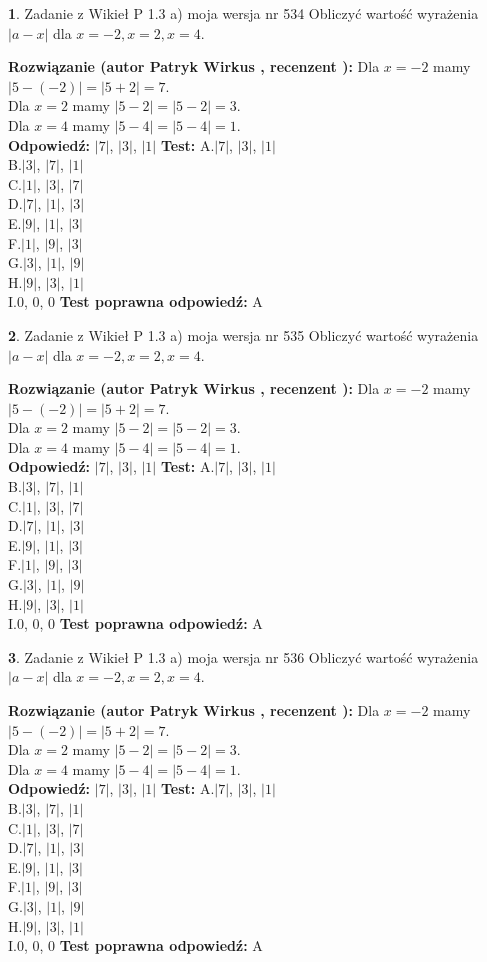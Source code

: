 \documentclass[12pt, a4paper]{article}
\theoremstyle{definition} %
\newtheorem{zad}{}
\newcommand{\zadStart}[1]{\begin{zad}#1\newline}
\newcommand{\zadStop}{\end{zad}}
\newcommand{\rozwStart}[2]{\noindent \textbf{Rozwiązanie (autor #1 , recenzent #2): }\newline}
\newcommand{\rozwStop}{\newline}
\newcommand{\odpStart}{\noindent \textbf{Odpowiedź:}\newline}
\newcommand{\odpStop}{\newline}
\newcommand{\testStart}{\noindent \textbf{Test:}\newline}
\newcommand{\testStop}{\newline}
\newcommand{\kluczStart}{\noindent \textbf{Test poprawna odpowiedź:}\newline}
\newcommand{\kluczStop}{\newline}
\begin{document}
\zadStart{Zadanie z Wikieł P 1.3 a) moja wersja nr 534}
Obliczyć wartość wyrażenia $|a - x|$ dla $x=-2,x=2,x=4$.
\zadStop
\rozwStart{Patryk Wirkus}{}
Dla $x = -2$ mamy $|5 - (-2)| = |5 + 2| = 7$.\\
Dla $x = 2$ mamy $|5 - 2| = |5 - 2| = 3$.\\
Dla $x = 4$ mamy $|5 - 4| = |5 - 4| = 1$.\\
\rozwStop
\odpStart
$|7|$, $|3|$, $|1|$
\odpStop
\testStart
A.$|7|$, $|3|$, $|1|$\\
B.$|3|$, $|7|$, $|1|$\\
C.$|1|$, $|3|$, $|7|$\\
D.$|7|$, $|1|$, $|3|$\\
E.$|9|$, $|1|$, $|3|$\\
F.$|1|$, $|9|$, $|3|$\\
G.$|3|$, $|1|$, $|9|$\\
H.$|9|$, $|3|$, $|1|$\\
I.$0$, $0$, $0$
\testStop
\kluczStart
A
\kluczStop



\zadStart{Zadanie z Wikieł P 1.3 a) moja wersja nr 535}
Obliczyć wartość wyrażenia $|a - x|$ dla $x=-2,x=2,x=4$.
\zadStop
\rozwStart{Patryk Wirkus}{}
Dla $x = -2$ mamy $|5 - (-2)| = |5 + 2| = 7$.\\
Dla $x = 2$ mamy $|5 - 2| = |5 - 2| = 3$.\\
Dla $x = 4$ mamy $|5 - 4| = |5 - 4| = 1$.\\
\rozwStop
\odpStart
$|7|$, $|3|$, $|1|$
\odpStop
\testStart
A.$|7|$, $|3|$, $|1|$\\
B.$|3|$, $|7|$, $|1|$\\
C.$|1|$, $|3|$, $|7|$\\
D.$|7|$, $|1|$, $|3|$\\
E.$|9|$, $|1|$, $|3|$\\
F.$|1|$, $|9|$, $|3|$\\
G.$|3|$, $|1|$, $|9|$\\
H.$|9|$, $|3|$, $|1|$\\
I.$0$, $0$, $0$
\testStop
\kluczStart
A
\kluczStop



\zadStart{Zadanie z Wikieł P 1.3 a) moja wersja nr 536}
Obliczyć wartość wyrażenia $|a - x|$ dla $x=-2,x=2,x=4$.
\zadStop
\rozwStart{Patryk Wirkus}{}
Dla $x = -2$ mamy $|5 - (-2)| = |5 + 2| = 7$.\\
Dla $x = 2$ mamy $|5 - 2| = |5 - 2| = 3$.\\
Dla $x = 4$ mamy $|5 - 4| = |5 - 4| = 1$.\\
\rozwStop
\odpStart
$|7|$, $|3|$, $|1|$
\odpStop
\testStart
A.$|7|$, $|3|$, $|1|$\\
B.$|3|$, $|7|$, $|1|$\\
C.$|1|$, $|3|$, $|7|$\\
D.$|7|$, $|1|$, $|3|$\\
E.$|9|$, $|1|$, $|3|$\\
F.$|1|$, $|9|$, $|3|$\\
G.$|3|$, $|1|$, $|9|$\\
H.$|9|$, $|3|$, $|1|$\\
I.$0$, $0$, $0$
\testStop
\kluczStart
A
\kluczStop
\end{document}
